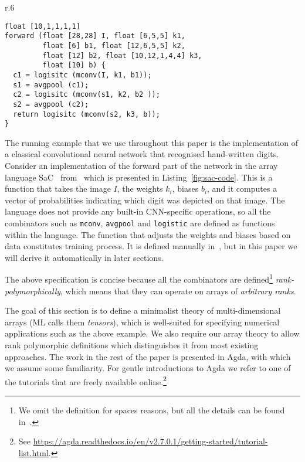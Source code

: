 \begin{wrapfigure}{r}{.6\linewidth}
\begin{lstlisting}[caption=SaC implementation of the CNN from~\cite{cnn-array},%
  label=fig:sac-code]
float [10,1,1,1,1] 
forward (float [28,28] I, float [6,5,5] k1,
         float [6] b1, float [12,6,5,5] k2,
         float [12] b2, float [10,12,1,4,4] k3,
         float [10] b) {
  c1 = logisitc (mconv(I, k1, b1));
  s1 = avgpool (c1);
  c2 = logisitc (mconv(s1, k2, b2 ));
  s2 = avgpool (c2);
  return logisitc (mconv(s2, k3, b));
}
\end{lstlisting}
\end{wrapfigure}
The running example that we use throughout this paper is the implementation of
a classical convolutional neural network that recognised hand-written digits.
Consider an implementation of the forward part of the network in the array 
language SaC~\cite{sac2}
from~\cite{cnn-array} which is presented in Listing~\ref{fig:sac-code}.
This is a function
that takes the image $I$, the weights $k_i$, biases $b_i$, and it computes
a vector of probabilities indicating which digit was depicted on that image.
The language does not provide any built-in CNN-specific operations, so all the
combinators such as \texttt{mconv}, \texttt{avgpool} and \texttt{logistic}
are defined as functions within the language.  The function that adjusts
the weights and biases based on data constitutes training process.  It is
defined manually in~\cite{cnn-array}, but in this paper we
will derive it automatically in later sections.

The above specification is concise
because all the combinators are defined\footnote{We omit the
definition for spaces reasons, but all the details can be found in~\cite{cnn-array}.}
\emph{rank-polymorphically}, which means that they can operate
on arrays of \emph{arbitrary ranks}.  

The goal of this section is to define a minimalist theory of multi-dimensional
arrays (ML calls them \emph{tensors}), which is well-suited for
specifying numerical applications such as the above example.
We also require our array theory to allow rank polymorphic definitions
which distinguishes it from most existing approaches.
The work in the rest of the paper is presented in Agda, with which we assume some
familiarity.
For gentle introductions to Agda we refer to one of the tutorials that are freely available
online.\footnote{See \url{https://agda.readthedocs.io/en/v2.7.0.1/getting-started/tutorial-list.html}.}

